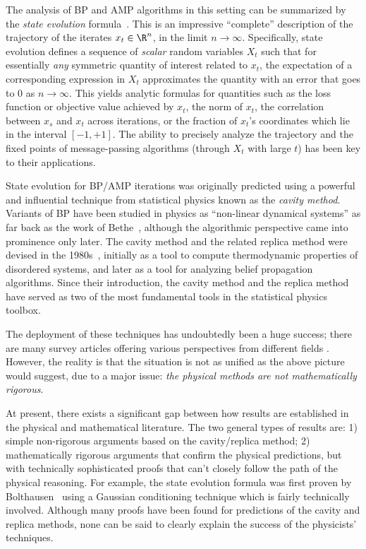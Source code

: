 \documentclass[12pt]{article}
\begin{document}
The analysis of BP and AMP algorithms in this setting can 
be summarized by the \emph{state evolution} formula~\cite{donoho2009message, bolthausen2014iterative}.
This is an impressive ``complete''
description of the trajectory of the iterates $x_t \in \R^n$, in the limit $n\to\infty$.
Specifically, state evolution
defines a sequence of {\em scalar} random variables $X_t$ such that for essentially \emph{any} symmetric quantity of interest
related to $x_t$,
the expectation of a corresponding expression in $X_t$
approximates the quantity with an error
that goes to $0$ as $n\to\infty$.
This yields analytic formulas for quantities such as the loss function or objective value achieved by $x_t$, the norm of $x_t$, the correlation between $x_s$ and $x_t$ across
iterations,
or the fraction of $x_t$'s coordinates which lie in the interval $[-1,+1]$.
The ability to precisely analyze the trajectory and the fixed points of message-passing algorithms (through $X_t$ with large $t$) has been key to their applications.


State evolution for BP/AMP iterations was originally predicted using a powerful and influential
technique from statistical physics known as the \emph{cavity method}.
Variants of BP have been studied in physics as ``non-linear dynamical systems'' as far back as the work of Bethe~\cite{bethe1935statistical}, although the algorithmic perspective came into prominence only later. 
The cavity method and the related replica method were devised in the 1980s~\cite{Parisi79,parisi1980sequence,cavityMethod86, mezard1987spinglasstheoryandbeyond}, initially as a tool to compute thermodynamic properties of disordered systems, and later as a tool for analyzing belief propagation algorithms.
Since their introduction, the cavity method and the replica method have served as two of the most fundamental
tools in the statistical physics toolbox.


The deployment of these techniques has undoubtedly been a huge success; there are many survey articles offering various perspectives from different fields \cite{yedidia2003understanding, MezardMontanari, koller2009probabilistic, zdeborova2016statistical, gabrie2020mean, feng2022unifying, zou2022concise, charbonneau2023spin}.
However, the reality is that the situation is not as unified as the above picture would suggest, due to a major issue:
\emph{the physical methods are not mathematically rigorous}.

At present, there exists a significant gap between how results are established in the physical and mathematical literature.
The two general types of results are: 1) simple non-rigorous arguments based on the cavity/replica method; 2) mathematically rigorous arguments that confirm the physical predictions, but with technically sophisticated proofs that can't closely follow the path of the physical reasoning.
For example, the state evolution formula  was first proven by Bolthausen~\cite{bolthausen2014iterative} using a Gaussian conditioning technique which is fairly technically involved.
Although many proofs have been found for predictions of the cavity and replica methods, none can be said to clearly explain the success of the physicists' techniques.
\end{document}
